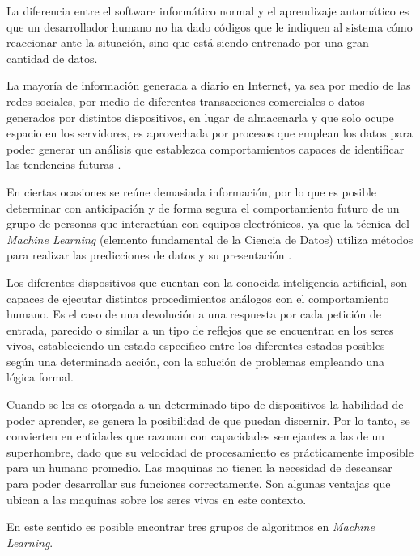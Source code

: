 La diferencia entre el software informático normal y el aprendizaje automático es que un desarrollador humano no ha dado códigos que le indiquen al sistema cómo reaccionar ante la situación, sino que está siendo entrenado por una gran cantidad de datos.

La mayoría de información generada a diario en Internet, ya sea por medio de las redes sociales, por medio de diferentes transacciones comerciales o datos generados por distintos dispositivos, en lugar de almacenarla y que solo ocupe espacio en los servidores, es aprovechada por procesos que emplean los datos para poder generar un análisis que establezca comportamientos capaces de identificar las tendencias futuras \cite{Sandoval2018}.

En ciertas ocasiones se reúne demasiada información, por lo que es posible determinar con anticipación y de forma segura el comportamiento futuro de un grupo de personas que interactúan con equipos electrónicos, ya que la técnica del \textit{Machine Learning} (elemento fundamental de la Ciencia de Datos) utiliza métodos para realizar las predicciones de datos y su presentación \cite{CornejoMacias2021}.

Los diferentes dispositivos que cuentan con la conocida inteligencia artificial, son capaces de ejecutar distintos procedimientos análogos con el comportamiento humano. Es el caso de una devolución a una respuesta por cada petición de entrada, parecido o similar a un tipo de reflejos que se encuentran en los seres vivos, estableciendo un estado especifico entre los diferentes estados posibles según una determinada acción, con la solución de problemas empleando una lógica formal. 

Cuando se les es otorgada a un determinado tipo de dispositivos la habilidad de poder aprender, se genera la posibilidad de que puedan discernir. Por lo tanto, se convierten en entidades que razonan con capacidades semejantes a las de un superhombre, dado que su velocidad de procesamiento es prácticamente imposible para un humano promedio. Las maquinas no tienen la necesidad de descansar para poder desarrollar sus funciones correctamente. Son algunas ventajas que ubican a las maquinas sobre los seres vivos en este contexto.

En este sentido es posible encontrar tres grupos de algoritmos en \textit{Machine Learning}.

